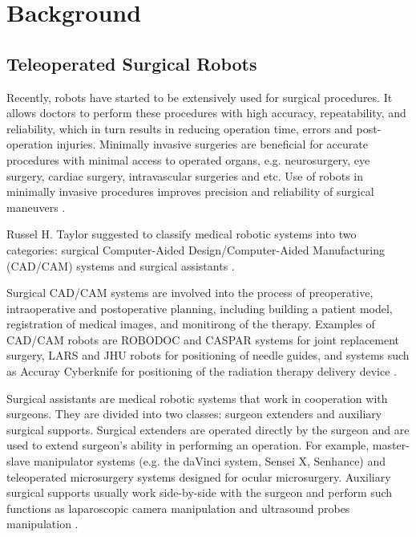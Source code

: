 \chapter{Background}
\label{back}

\section{Teleoperated Surgical Robots}
\label{sec:daVinci}
Recently, robots have started to be extensively used for surgical procedures. It allows doctors to perform these procedures with high accuracy, repeatability, and reliability, which in turn results in reducing operation time, errors and post-operation injuries. Minimally invasive surgeries are beneficial for accurate procedures with minimal access to operated organs, e.g. neurosurgery, eye surgery, cardiac surgery, intravascular surgeries and etc.  Use of robots in minimally invasive procedures improves precision and reliability of surgical maneuvers \cite{tavakoli_haptics_2008}.

Russel H. Taylor suggested to classify medical robotic systems into two categories: surgical Computer-Aided Design/Computer-Aided Manufacturing (CAD/CAM) systems and surgical assistants \cite{taylor_medical_2003}.

Surgical CAD/CAM systems are involved into the process of preoperative, intraoperative and postoperative planning, including building a patient model, registration of medical images, and monitirong of the therapy. Examples of CAD/CAM robots are ROBODOC and CASPAR systems for joint replacement surgery, LARS and JHU robots for positioning of needle guides, and systems such as Accuray Cyberknife for positioning of the radiation therapy delivery device \cite{taylor_medical_2003}. 

Surgical assistants are medical robotic systems that work in cooperation with surgeons. They are divided into two classes: surgeon extenders and auxiliary surgical supports. Surgical extenders are operated directly by the surgeon and are used to extend surgeon's ability in performing an operation. For example, master-slave manipulator systems (e.g. the daVinci system, Sensei X, Senhance) and teleoperated microsurgery systems designed for ocular microsurgery.  Auxiliary surgical supports usually work side-by-side with the surgeon and perform such functions as laparoscopic camera manipulation and ultrasound probes manipulation \cite{taylor_medical_2003}. 


